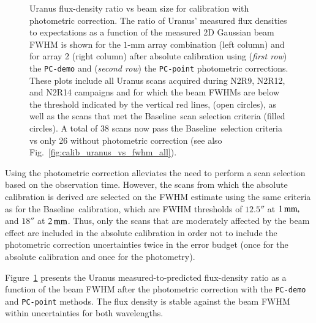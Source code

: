 \documentclass[traditionalabstract]{aa}
\newcommand{\baseline}{Baseline}%
\begin{document}
{\begin{appendix}
\begin{figure}[!htbp]
\begin{center}
    \vspace{-0.5cm}
    \caption[Uranus flux density stability against FWHM]{
      \small{Uranus flux-density ratio vs beam size for calibration
  with photometric correction. The ratio of 
      Uranus' measured flux densities to expectations as a function of the
      measured 2D Gaussian beam FWHM is shown for the $1$-mm array
      combination (left column) and for array 2 (right column) after absolute
      calibration using (\emph{first row}) the {\tt PC-demo} and (\emph{second
        row}) the {\tt PC-point} photometric corrections. These plots
      include all Uranus scans acquired during N2R9, N2R12, and N2R14
      campaigns and for which the beam FWHMs are below the threshold indicated
      by the vertical red lines, (open circles), as
      well as the scans that met the \baseline\ scan selection criteria (filled
      circles). A total of 38 scans now pass the \baseline\ selection criteria vs only 26
      without photometric correction (see also Fig.~\ref{fig:calib_uranus_vs_fwhm_all}).}}
\label{fig:calib_uranus_vs_fwhm_photocorr}
\end{center}
\end{figure}

Using the photometric correction alleviates the need to
perform a scan selection based on the observation time. However,
the scans from which the absolute calibration is derived are selected
on the FWHM estimate using the same criteria as for the \baseline\
calibration, which are FWHM thresholds of $12.5''$ at $1\, \rm{mm,}$ and $18''$ at
$2\, \rm{mm}$. Thus, only the scans that are moderately affected by the beam
effect are included in the absolute calibration in order not to
include the photometric correction uncertainties twice in the error
budget (once for the absolute calibration and once for the photometry).

Figure~\ref{fig:calib_uranus_vs_fwhm_photocorr} presents the Uranus
measured-to-predicted flux-density ratio as a function of the beam FWHM
after the photometric correction with the {\tt PC-demo} and
{\tt PC-point} methods. The flux
density is stable against the beam FWHM within uncertainties for both
wavelengths.


\end{appendix}}
\end{document}
